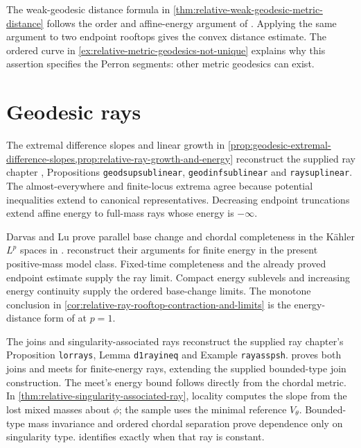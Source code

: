 The weak-geodesic distance formula in \cref{thm:relative-weak-geodesic-metric-distance} follows the order and affine-energy argument of \cite[Proposition 3.13, pp.~3074--3075]{DDNL18big}. Applying the same argument to two endpoint rooftops gives the convex distance estimate. The ordered curve in \cref{ex:relative-metric-geodesics-not-unique} explains why this assertion specifies the Perron segments: other metric geodesics can exist.

\section{Geodesic rays}\label{sec:history-geodesic-rays}
The extremal difference slopes and linear growth in \cref{prop:geodesic-extremal-difference-slopes,prop:relative-ray-growth-and-energy} reconstruct the supplied ray chapter \cite{XiaSampleBook}, Propositions \texttt{geodsupsublinear}, \texttt{geodinfsublinear} and \texttt{raysuplinear}. The almost-everywhere and finite-locus extrema agree because potential inequalities extend to canonical representatives. Decreasing endpoint truncations extend affine energy to full-mass rays whose energy is $-\infty$.

Darvas and Lu prove parallel base change and chordal completeness in the K\"ahler $L^p$ spaces in \cite[Proposition 4.1 and Theorem 4.2, pp.~1928--1930]{DL20}.  reconstruct their arguments for finite energy in the present positive-mass model class. Fixed-time completeness and the already proved endpoint estimate supply the ray limit. Compact energy sublevels and increasing energy continuity supply the ordered base-change limits. The monotone conclusion in \cref{cor:relative-ray-rooftop-contraction-and-limits} is the energy-distance form of \cite[Lemma 4.3, pp.~1930--1931]{DL20} at $p=1$.

The joins and singularity-associated rays reconstruct the supplied ray chapter's Proposition \texttt{lorrays}, Lemma \texttt{d1rayineq} and Example \texttt{rayasspsh}.  proves both joins and meets for finite-energy rays, extending the supplied bounded-type join construction. The meet's energy bound follows directly from the chordal metric. In \cref{thm:relative-singularity-associated-ray}, locality computes the slope from the lost mixed masses about $\phi$; the sample uses the minimal reference $V_\theta$. Bounded-type mass invariance and ordered chordal separation prove dependence only on singularity type.  identifies exactly when that ray is constant.


